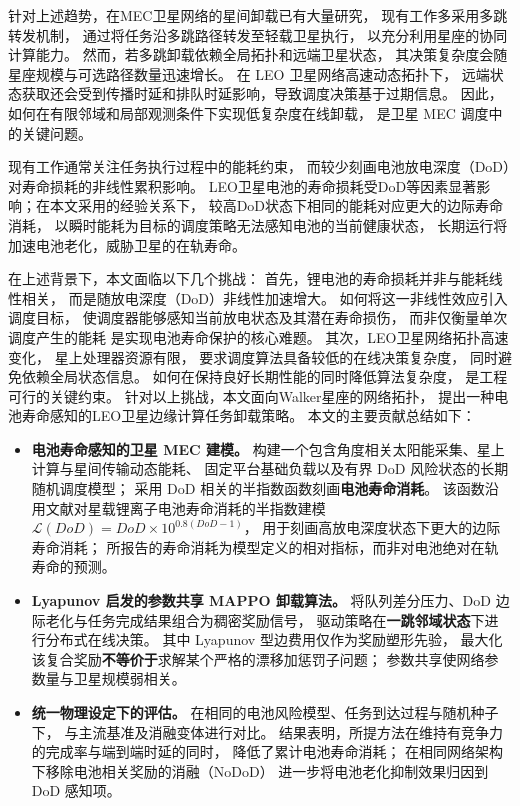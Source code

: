 \documentclass[a4paper,11pt]{article}
\begin{document}
针对上述趋势，在MEC卫星网络的星间卸载已有大量研究，
现有工作多采用多跳转发机制，
通过将任务沿多跳路径转发至轻载卫星执行，
以充分利用星座的协同计算能力\cite{zhang2024mhspo}。
然而，若多跳卸载依赖全局拓扑和远端卫星状态，
其决策复杂度会随星座规模与可选路径数量迅速增长。
在 LEO 卫星网络高速动态拓扑下，
远端状态获取还会受到传播时延和排队时延影响，导致调度决策基于过期信息。
因此，如何在有限邻域和局部观测条件下实现低复杂度在线卸载，
是卫星 MEC 调度中的关键问题\cite{chen2025gdco}。

现有工作通常关注任务执行过程中的能耗约束，
而较少刻画电池放电深度（DoD）对寿命损耗的非线性累积影响\cite{energyconstrained}。
LEO卫星电池的寿命损耗受DoD等因素显著影响；在本文采用的经验关系下，
较高DoD状态下相同的能耗对应更大的边际寿命消耗\cite{chen2025tasri}，
以瞬时能耗为目标的调度策略无法感知电池的当前健康状态，
长期运行将加速电池老化，威胁卫星的在轨寿命\cite{li2024battery}。

在上述背景下，本文面临以下几个挑战：
首先，锂电池的寿命损耗并非与能耗线性相关，
而是随放电深度（DoD）非线性加速增大。
如何将这一非线性效应引入调度目标，
使调度器能够感知当前放电状态及其潜在寿命损伤，
而非仅衡量单次调度产生的能耗
是实现电池寿命保护的核心难题。
其次，LEO卫星网络拓扑高速变化，
星上处理器资源有限，
要求调度算法具备较低的在线决策复杂度，
同时避免依赖全局状态信息。
如何在保持良好长期性能的同时降低算法复杂度，
是工程可行的关键约束。
针对以上挑战，本文面向Walker星座的网络拓扑，
提出一种电池寿命感知的LEO卫星边缘计算任务卸载策略。
本文的主要贡献总结如下：
\begin{itemize}
    \item \textbf{电池寿命感知的卫星 MEC 建模。}
    构建一个包含角度相关太阳能采集、星上计算与星间传输动态能耗、
    固定平台基础负载以及有界 DoD 风险状态的长期随机调度模型；
    采用 DoD 相关的半指数函数刻画\textbf{电池寿命消耗}。
    该函数沿用文献\cite{chen2025tasri}对星载锂离子电池寿命消耗的半指数建模
    $\mathcal{L}(DoD)=DoD\times10^{0.8(DoD-1)}$，
    用于刻画高放电深度状态下更大的边际寿命消耗；
    所报告的寿命消耗为模型定义的相对指标，而非对电池绝对在轨寿命的预测。

    \item \textbf{Lyapunov 启发的参数共享 MAPPO 卸载算法。}
    将队列差分压力、DoD 边际老化与任务完成结果组合为稠密奖励信号，
    驱动策略在\textbf{一跳邻域状态}下进行分布式在线决策。
    其中 Lyapunov 型边费用仅作为奖励塑形先验，
    最大化该复合奖励\textbf{不等价于}求解某个严格的漂移加惩罚子问题；
    参数共享使网络参数量与卫星规模弱相关。

    \item \textbf{统一物理设定下的评估。}
    在相同的电池风险模型、任务到达过程与随机种子下，
    与主流基准及消融变体进行对比。
    结果表明，所提方法在维持有竞争力的完成率与端到端时延的同时，
    降低了累计电池寿命消耗；
    在相同网络架构下移除电池相关奖励的消融（NoDoD）
    进一步将电池老化抑制效果归因到 DoD 感知项。
\end{itemize}
\end{document}

